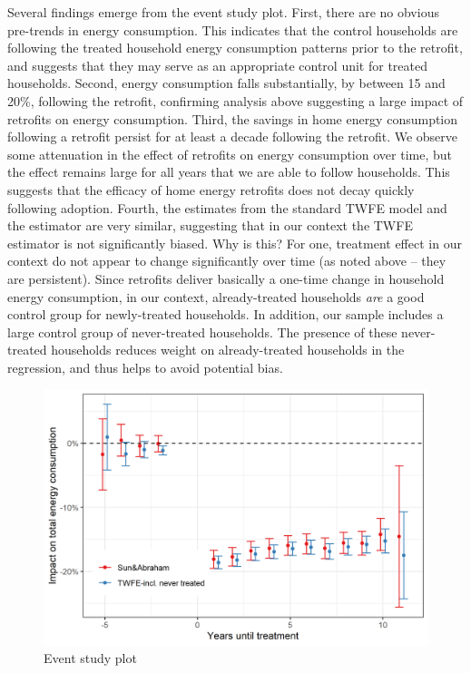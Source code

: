 \documentclass{article}
\begin{document}
Several findings emerge from the event study plot.  First, there are no obvious pre-trends in energy consumption. This indicates that the control households are following the treated household energy consumption patterns prior to the retrofit, and suggests that they may serve as an appropriate control unit for treated households. Second, energy consumption falls substantially, by between 15 and 20\%, following the retrofit, confirming analysis above suggesting a large impact of retrofits on energy consumption. Third, the savings in home energy consumption following a retrofit persist for at least a decade following the retrofit. We observe some attenuation in the effect of retrofits on energy consumption over time, but the effect remains large for all years that we are able to follow households. This suggests that the efficacy of home energy retrofits does not decay quickly following adoption. Fourth, the estimates from the standard TWFE model and the \cite{sun2021estimating} estimator are very similar, suggesting that in our context the TWFE estimator is not significantly biased. Why is this? For one, treatment effect in our context do not appear to change significantly over time (as noted above -- they are persistent). Since retrofits deliver basically a one-time change in household energy consumption, in our context, already-treated households \textit{are} a good control group for newly-treated households. In addition, our sample includes a large control group of never-treated households. The presence of these never-treated households reduces weight on already-treated households in the regression, and thus helps to avoid potential bias.


\begin{figure}
	\includegraphics{../output_figures_tables/event_study_plot_twfe_sa_only}
	\caption{Event study plot}\label{fig_esplot}
\end{figure}
\end{document}
